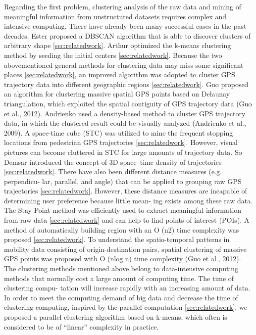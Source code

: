 \documentclass[conference]{IEEEtran}
\begin{document}
  Regarding the first problem, clustering analysis of the raw data and mining of meaningful information from unstructured datasets requires complex and 
intensive computing. There have already been many successful cases in the past decades. Ester proposed a DBSCAN algorithm that is able to discover 
clusters of arbitrary shape \ref{sec:relatedwork}. Arthur optimized the k-means clustering method by seeding the initial centers \ref{sec:relatedwork}. Because the two abovementioned general methods for clustering data may miss some significant places \ref{sec:relatedwork}, an improved algorithm was adopted to cluster GPS trajectory data into different geographic regions \ref{sec:relatedwork}. Guo proposed an 
algorithm for clustering massive spatial GPS points based on Delaunay triangulation, which exploited the spatial contiguity of GPS trajectory data (Guo et 
al., 2012). Andrienko used a density-based method to cluster GPS trajectory data, in which the clustered result could be visually analyzed (Andrienko et 
al., 2009). A space-time cube (STC) was utilized to mine the frequent stopping locations from pedestrian GPS trajectories \ref{sec:relatedwork}. However, visual pictures can become cluttered in STC for large amounts of trajectory data. So Demsar introduced the concept of 3D 
space–time density of trajectories \ref{sec:relatedwork}. There have also been different distance measures (e.g. perpendicu- lar, parallel, and 
angle) that can be applied to grouping raw GPS trajectories \ref{sec:relatedwork}. However, these distance measures 
are incapable of determining user preference because little mean- ing exists among these raw data. The Stay Point method was efficiently used to extract 
meaningful information from raw data \ref{sec:relatedwork} and can help to find points of interest (POIs). A method of 
automatically building region with an O (n2) time complexity was proposed \ref{sec:relatedwork}. To understand the spatio-temporal patterns in mobility data 
consisting of origin-destination pairs, spatial clustering of massive GPS points was proposed with O (nlog n) time complexity (Guo et al., 2012). The 
clustering methods mentioned above belong to data-intensive computing methods that normally cost a large amount of computing time. The time of clustering 
compu- tation will increase rapidly with an increasing amount of data. In order to meet the computing demand of big data and decrease the time of 
clustering computing, inspired by the parallel computation \ref{sec:relatedwork}, we proposed a parallel clustering 
algorithm based on k-means, which often is considered to be of “linear” complexity in practice.
\end{document}
